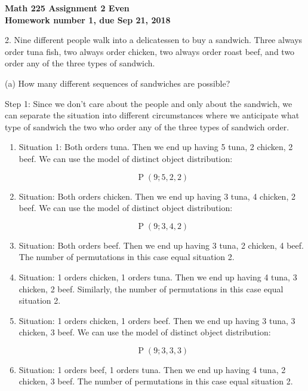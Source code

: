 \documentclass[12pt]{amsart}
\DeclareMathOperator{\perm}{P}
\begin{document}
\begin{center}
  \bfseries
  Math 225 Assignment 2 Even\\
  Homework number 1, due Sep 21, 2018
\end{center}

\bigskip

2. Nine different people walk into a delicatessen to buy a sandwich. Three always
order tuna fish, two always order chicken, two always order roast beef, and two
order any of the three types of sandwich.
\bigskip

(a) How many different sequences of sandwiches are possible?
\bigskip

Step 1: Since we don't care about the people and only about the sandwich, we can separate the situation into different circumstances where we anticipate  what type of sandwich the two who order any of the three types of sandwich order.
\smallskip

\begin{enumerate}
\item Situation 1: Both orders tuna. Then we end up having 5 tuna, 2 chicken, 2 beef. We can use the model of distinct object distribution:

\begin{displaymath}
\perm(9;5,2,2)
\end{displaymath}

\item Situation: Both orders chicken. Then we end up having 3 tuna, 4 chicken, 2 beef. We can use the model of distinct object distribution:

\begin{displaymath}
\perm(9;3,4,2)
\end{displaymath}

\item Situation: Both orders beef. Then we end up having 3 tuna, 2 chicken, 4 beef. The number of permutations in this case equal situation 2. 
\smallskip

\item Situation: 1 orders chicken, 1 orders tuna. Then we end up having 4 tuna, 3 chicken, 2 beef. Similarly, the number of permutations in this case equal situation 2. 
\smallskip

\item Situation: 1 orders chicken, 1 orders beef. Then we end up having 3 tuna, 3 chicken, 3 beef. We can use the model of distinct object distribution:

\begin{displaymath}
\perm(9;3,3,3)
\end{displaymath}

\item Situation: 1 orders beef, 1 orders tuna. Then we end up having 4 tuna, 2 chicken, 3 beef. The number of permutations in this case equal situation 2. 
\smallskip
\end{enumerate}
\end{document}
